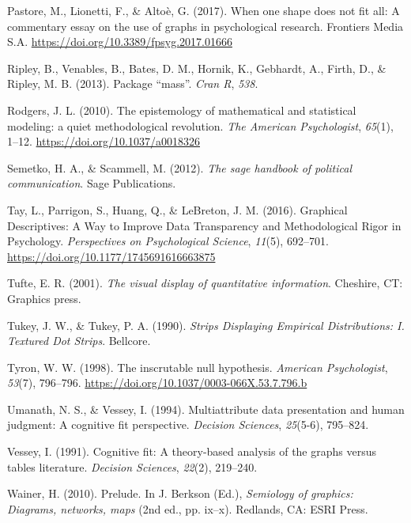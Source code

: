 \documentclass[
  english,
  man]{apa6}
\newlength{\cslhangindent}
\newenvironment{cslreferences}%
  {\setlength{\parindent}{0pt}%
  \everypar{\setlength{\hangindent}{\cslhangindent}}\ignorespaces}%
  {\par}
\begin{document}
\begin{cslreferences}
\leavevmode\hypertarget{ref-Pastore2017}{}%
Pastore, M., Lionetti, F., \& Altoè, G. (2017). When one shape does not fit all: A commentary essay on the use of graphs in psychological research. Frontiers Media S.A. \url{https://doi.org/10.3389/fpsyg.2017.01666}

\leavevmode\hypertarget{ref-ripley2013package}{}%
Ripley, B., Venables, B., Bates, D. M., Hornik, K., Gebhardt, A., Firth, D., \& Ripley, M. B. (2013). Package ``mass''. \emph{Cran R}, \emph{538}.

\leavevmode\hypertarget{ref-rodgers_epistemology_2010}{}%
Rodgers, J. L. (2010). The epistemology of mathematical and statistical modeling: a quiet methodological revolution. \emph{The American Psychologist}, \emph{65}(1), 1--12. \url{https://doi.org/10.1037/a0018326}

\leavevmode\hypertarget{ref-semetko2012sage}{}%
Semetko, H. A., \& Scammell, M. (2012). \emph{The sage handbook of political communication}. Sage Publications.

\leavevmode\hypertarget{ref-Tay2016a}{}%
Tay, L., Parrigon, S., Huang, Q., \& LeBreton, J. M. (2016). Graphical Descriptives: A Way to Improve Data Transparency and Methodological Rigor in Psychology. \emph{Perspectives on Psychological Science}, \emph{11}(5), 692--701. \url{https://doi.org/10.1177/1745691616663875}

\leavevmode\hypertarget{ref-Tufte2001}{}%
Tufte, E. R. (2001). \emph{The visual display of quantitative information}. Cheshire, CT: Graphics press.

\leavevmode\hypertarget{ref-Tukey1990}{}%
Tukey, J. W., \& Tukey, P. A. (1990). \emph{Strips Displaying Empirical Distributions: I. Textured Dot Strips}. Bellcore.

\leavevmode\hypertarget{ref-Tyron1998}{}%
Tyron, W. W. (1998). The inscrutable null hypothesis. \emph{American Psychologist}, \emph{53}(7), 796--796. \url{https://doi.org/10.1037/0003-066X.53.7.796.b}

\leavevmode\hypertarget{ref-umanath1994multiattribute}{}%
Umanath, N. S., \& Vessey, I. (1994). Multiattribute data presentation and human judgment: A cognitive fit perspective. \emph{Decision Sciences}, \emph{25}(5-6), 795--824.

\leavevmode\hypertarget{ref-vessey1991cognitive}{}%
Vessey, I. (1991). Cognitive fit: A theory-based analysis of the graphs versus tables literature. \emph{Decision Sciences}, \emph{22}(2), 219--240.

\leavevmode\hypertarget{ref-Wainer2010}{}%
Wainer, H. (2010). Prelude. In J. Berkson (Ed.), \emph{Semiology of graphics: Diagrams, networks, maps} (2nd ed., pp. ix--x). Redlands, CA: ESRI Press.


\end{cslreferences}
\end{document}
